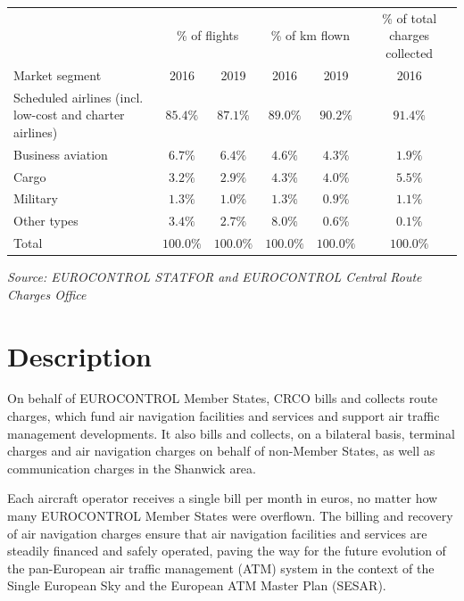 \documentclass[
  11pt,
  a4paper,
]{book}
\begin{document}
\setlength{\LTpost}{0mm}
\begin{longtable}{lccccc}
\toprule
 & \multicolumn{2}{c}{\% of flights} & \multicolumn{2}{c}{\% of km flown} & \% of total charges collected \\ 
\cmidrule(lr){2-3} \cmidrule(lr){4-5} \cmidrule(lr){6-6}
Market segment & 2016 & 2019 & 2016 & 2019 & 2016 \\ 
\midrule
Scheduled airlines (incl. low-cost and charter airlines) & $85.4\%$ & $87.1\%$ & $89.0\%$ & $90.2\%$ & $91.4\%$ \\ 
Business aviation & $6.7\%$ & $6.4\%$ & $4.6\%$ & $4.3\%$ & $1.9\%$ \\ 
Cargo & $3.2\%$ & $2.9\%$ & $4.3\%$ & $4.0\%$ & $5.5\%$ \\ 
Military & $1.3\%$ & $1.0\%$ & $1.3\%$ & $0.9\%$ & $1.1\%$ \\ 
Other types & $3.4\%$ & $2.7\%$ & $8.0\%$ & $0.6\%$ & $0.1\%$ \\ 
Total & $100.0\%$ & $100.0\%$ & $100.0\%$ & $100.0\%$ & $100.0\%$ \\ 
\bottomrule
\end{longtable}
\begin{minipage}{\linewidth}
\emph{Source: EUROCONTROL STATFOR and EUROCONTROL Central Route Charges Office}\\
\end{minipage}

\hypertarget{description-11}{%
\section{Description}\label{description-11}}

On behalf of EUROCONTROL Member States, CRCO bills and collects route
charges, which fund air navigation facilities and services and support
air traffic management developments. It also bills and collects, on a
bilateral basis, terminal charges and air navigation charges on behalf
of non-Member States, as well as communication charges in the Shanwick
area.

Each aircraft operator receives a single bill per month in euros, no
matter how many EUROCONTROL Member States were overflown. The billing
and recovery of air navigation charges ensure that air navigation
facilities and services are steadily financed and safely operated,
paving the way for the future evolution of the pan-European air traffic
management (ATM) system in the context of the Single European Sky and
the European ATM Master Plan (SESAR).
\end{document}
